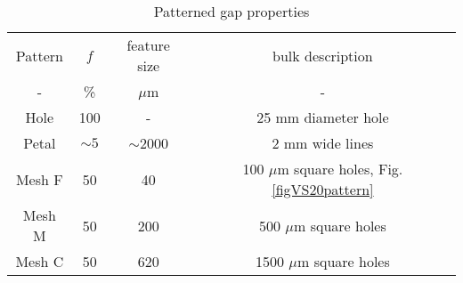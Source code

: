 \begin{table}[h!]
\caption{Patterned gap properties \label{tbl_meshPatterns}}
\begin{center}
    \begin{tabular}{ c c c c }
    \hline
    Pattern & $f$ & feature size & bulk description \\ 
    - & \% & $\mu$m & - \\ 
    \hline
    Hole   & 100     &  -         & 25 mm diameter hole \\     
    Petal  & $\sim5$ & $\sim$2000 & 2 mm wide lines \\         
    Mesh F & 50      &         40 & 100 $\mu$m square holes, Fig. \ref{figVS20pattern}\\ 
    Mesh M & 50      & 200        & 500 $\mu$m square holes\\ 
    Mesh C & 50      & 620        & 1500 $\mu$m square holes\\     
        \hline
    \end{tabular}
\end{center}
\end{table}